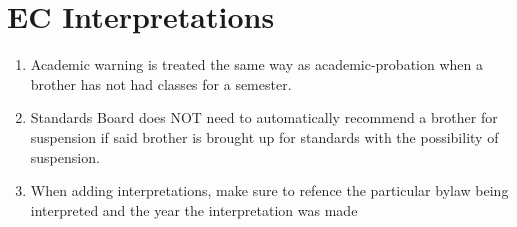 \chapter{EC Interpretations}
\begin{enumerate}
	\item Academic warning is treated the same way as \gls{academic-probation} when a brother has not had classes for a semester.
	\item Standards Board does NOT need to automatically recommend a brother for suspension if said brother is brought up for standards with the possibility of suspension.
	\item When adding interpretations, make sure to refence the particular bylaw being interpreted and the year the interpretation was made
\end{enumerate}
